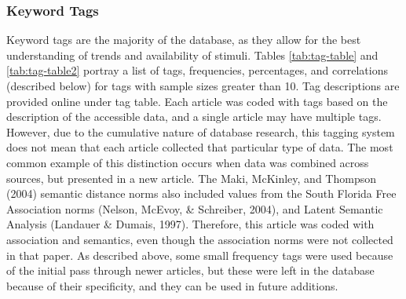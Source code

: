 \documentclass[english,,man]{apa6}
\theoremstyle{definition}
\theoremstyle{definition}
\theoremstyle{definition}
\theoremstyle{remark}
\begin{document}
\hypertarget{keyword-tags}{%
\subsubsection{Keyword Tags}\label{keyword-tags}}

Keyword tags are the majority of the database, as they allow for the
best understanding of trends and availability of stimuli. Tables
\ref{tab:tag-table} and \ref{tab:tag-table2} portray a list of tags,
frequencies, percentages, and correlations (described below) for tags
with sample sizes greater than 10. Tag descriptions are provided online
under tag table. Each article was coded with tags based on the
description of the accessible data, and a single article may have
multiple tags. However, due to the cumulative nature of database
research, this tagging system does not mean that each article collected
that particular type of data. The most common example of this
distinction occurs when data was combined across sources, but presented
in a new article. The Maki, McKinley, and Thompson (2004) semantic
distance norms also included values from the South Florida Free
Association norms (Nelson, McEvoy, \& Schreiber, 2004), and Latent
Semantic Analysis (Landauer \& Dumais, 1997). Therefore, this article
was coded with association and semantics, even though the association
norms were not collected in that paper. As described above, some small
frequency tags were used because of the initial pass through newer
articles, but these were left in the database because of their
specificity, and they can be used in future additions.
\end{document}
